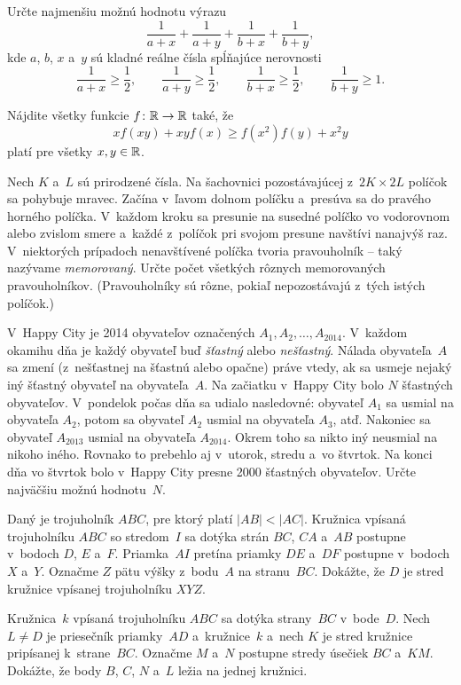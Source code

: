 {%
Určte najmenšiu možnú hodnotu výrazu
$$
\frac{1}{a+x} + \frac{1}{a+y} + \frac{1}{b+x} + \frac{1}{b+y},
$$
kde $a$, $b$, $x$ a~$y$ sú kladné reálne čísla spĺňajúce nerovnosti
$$
		\frac{1}{a+x} \ge \frac{1}{2}, \qquad
		\frac{1}{a+y} \ge \frac{1}{2}, \qquad
		\frac{1}{b+x} \ge \frac{1}{2},  \qquad
		\frac{1}{b+y} \ge 1.
$$}

{%
Nájdite všetky funkcie $f\colon\Bbb R\to\Bbb R$ také, že
$$
	xf(xy)+xy f(x)\ge f(x^2)f(y)+x^2y
$$
platí pre všetky $x,y\in\Bbb R$.}

{%
Nech $K$ a~$L$ sú prirodzené čísla. Na šachovnici pozostávajúcej z~$2K\times 2L$ políčok sa pohybuje mravec. Začína v~ľavom dolnom políčku a~presúva sa do pravého horného políčka. V~každom kroku sa presunie na susedné políčko vo vodorovnom alebo zvislom smere a~každé z~políčok pri svojom presune navštívi nanajvýš raz. V~niektorých prípadoch nenavštívené políčka tvoria pravouholník -- taký nazývame {\it memorovaný}.
Určte počet všetkých rôznych memorovaných pravouholníkov. (Pravouholníky sú rôzne, pokiaľ nepozostávajú z~tých istých políčok.)	
}

{%
V~Happy City je 2014 obyvateľov označených $A_1,A_2,\dots,A_{2014}$. V~každom okamihu dňa je každý obyvateľ buď {\it šťastný\/} alebo {\it nešťastný}. Nálada obyvateľa~$A$ sa zmení (z~nešťastnej na šťastnú alebo opačne) práve vtedy, ak sa usmeje nejaký iný šťastný obyvateľ na obyvateľa~$A$. Na začiatku v~Happy City bolo $N$ šťastných obyvateľov. V~pondelok počas dňa sa udialo nasledovné: obyvateľ $A_1$ sa usmial na obyvateľa $A_2$, potom sa obyvateľ $A_2$ usmial na obyvateľa $A_3$, atď. Nakoniec sa obyvateľ $A_{2013}$ usmial na obyvateľa $A_{2014}$. Okrem toho sa nikto iný neusmial na nikoho iného. Rovnako to prebehlo aj v~utorok, stredu a~vo štvrtok. Na konci dňa vo štvrtok bolo v~Happy City presne 2000 šťastných obyvateľov. Určte najväčšiu možnú hodnotu~$N$.
}

{%
Daný je trojuholník $ABC$, pre ktorý platí $|AB| < |AC|$. Kružnica vpísaná trojuholníku $ABC$ so stredom~$I$ sa dotýka strán $BC$, $CA$ a~$AB$ postupne v~bodoch $D$, $E$ a~$F$. Priamka~$AI$ pretína priamky $DE$ a~$DF$ postupne v~bodoch $X$ a~$Y$. Označme $Z$ pätu výšky z~bodu~$A$ na stranu~$BC$.
Dokážte, že $D$ je stred kružnice vpísanej trojuholníku $XYZ$.
}

{%
Kružnica~$k$ vpísaná trojuholníku $ABC$ sa dotýka strany~$BC$ v~bode~$D$. Nech $L\ne D$ je priesečník priamky~$AD$ a~kružnice~$k$ a~nech $K$ je stred kružnice pripísanej k~strane~$BC$. Označme $M$ a~$N$ postupne stredy úsečiek $BC$ a~$KM$. Dokážte, že body $B$, $C$, $N$ a~$L$ ležia na jednej kružnici.}

